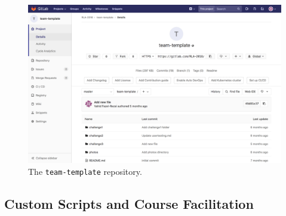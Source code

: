 \documentclass[12pt,twoside]{mitthesis}
\begin{document}
\begin{figure}[h]
\centering
\includegraphics[scale=0.3]{fig-team-template.png}
\caption{\label{fig-team-template} The \texttt{team-template} repository.}
\end{figure}


\subsection{Custom Scripts and Course Facilitation}
\end{document}
